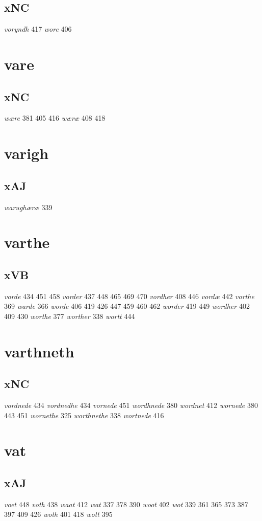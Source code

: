 \documentclass[a4paper,twocolumn]{article}
\begin{document}
\subsection{xNC}
\label{sec:org37e9efe}
\emph{voryndh} 417 \emph{wore} 406 
\section{vare}
\label{sec:orgba30a38}
\subsection{xNC}
\label{sec:org6c9a47c}
\emph{wære} 381 405 416 \emph{wæræ} 408 418 
\section{varigh}
\label{sec:orgb12fe19}
\subsection{xAJ}
\label{sec:orgf8db411}
\emph{warughæræ} 339 
\section{varthe}
\label{sec:org2cf87d2}
\subsection{xVB}
\label{sec:org9ce49bf}
\emph{vorde} 434 451 458 \emph{vorder} 437 448 465 469 470 \emph{vordher} 408 446 \emph{vordæ} 442 \emph{vorthe} 369 \emph{warde} 366 \emph{worde} 406 419 426 447 459 460 462 \emph{worder} 419 449 \emph{wordher} 402 409 430 \emph{worthe} 377 \emph{worther} 338 \emph{wortt} 444 
\section{varthneth}
\label{sec:orgf4715b4}
\subsection{xNC}
\label{sec:org6a87b66}
\emph{vordnede} 434 \emph{vordnedhe} 434 \emph{vornede} 451 \emph{wordhnede} 380 \emph{wordnet} 412 \emph{wornede} 380 443 451 \emph{wornethe} 325 \emph{worthnethe} 338 \emph{wortnede} 416 
\section{vat}
\label{sec:org42d607d}
\subsection{xAJ}
\label{sec:orge0d3731}
\emph{voet} 448 \emph{voth} 438 \emph{waat} 412 \emph{wat} 337 378 390 \emph{woot} 402 \emph{wot} 339 361 365 373 387 397 409 426 \emph{woth} 401 418 \emph{wott} 395 
\end{document}
